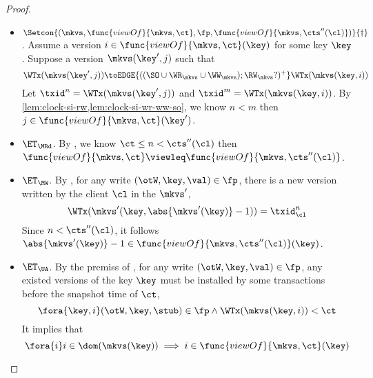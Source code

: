 \begin{proof}
\begin{itemize}
        \item \( \Setcon{(\mkvs, \func{viewOf}{\mkvs,\ct}, \fp, \func{viewOf}{\mkvs,\cts''(\cl)})}{\dagger} \).
            Assume a version \( i \in \func{viewOf}{\mkvs,\ct}(\key) \) for some key \( \key \).
            Suppose a version \( \mkvs(\key',j)\) such that 
            \[ 
                \WTx(\mkvs(\key',j)) \toEDGE{((\SO \cup \WR_{\mkvs} \cup \WW_{\mkvs}) ; \RW_{\mkvs}?)^+} \WTx(\mkvs(\key,i))
            \]
            Let \( \txid^n = \WTx(\mkvs(\key',j)) \) and \( \txid^m = \WTx(\mkvs(\key,i)) \).
            By \cref{lem:clock-si-rw,lem:clock-si-wr-ww-so}, we know \( n < m \) then \( j  \in \func{viewOf}{\mkvs,\ct}(\key')\).
        \item \( \ET_\MRd \).
            By , we know \( \ct \leq n < \cts''(\cl) \) then \( \func{viewOf}{\mkvs,\ct} \viewleq \func{viewOf}{\mkvs,\cts''(\cl)} \).
        \item \( \ET_\MW \).
            By , for any write \( (\otW, \key, \val) \in \fp \), there is a new version written by the client \( \cl \) in the \( \mkvs'  \),
            \[
                \WTx(\mkvs'(\key,\abs{\mkvs'(\key)} - 1)) = \txid_\cl^{n}
            \]
            Since \( n < \cts''(\cl)\), it follows \( \abs{\mkvs'(\key)} - 1 \in \func{viewOf}{\mkvs,\cts''(\cl)}(\key) \).
        \item \( \ET_\UA \).
            By the premiss of , for any write \( (\otW, \key, \val) \in \fp \), any existed versions of the key \( \key \)
            must be installed by some transactions before the snapshot time of \( \ct \),
            \[
                \fora{\key,i} (\otW, \key, \stub) \in \fp \land \WTx(\mkvs(\key,i)) < \ct 
            \]
            It implies that 
            \[ 
                \fora{i} i \in \dom(\mkvs(\key)) \implies i \in \func{viewOf}{\mkvs,\ct}(\key) 
            \]
    \end{itemize}
\end{proof}

